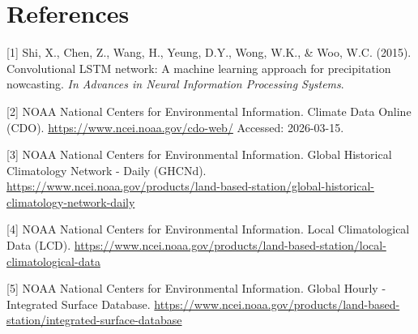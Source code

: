 \documentclass{article}
\begin{document}
\section*{References}

\medskip
{
\small
[1] Shi, X., Chen, Z., Wang, H., Yeung, D.Y., Wong, W.K., \& Woo, W.C. (2015). Convolutional LSTM network: A machine learning approach for precipitation nowcasting. \textit{In Advances in Neural Information Processing Systems}.

[2] NOAA National Centers for Environmental Information. Climate Data Online (CDO). \url{https://www.ncei.noaa.gov/cdo-web/} Accessed: 2026-03-15.

[3] NOAA National Centers for Environmental Information. Global Historical Climatology Network - Daily (GHCNd). \url{https://www.ncei.noaa.gov/products/land-based-station/global-historical-climatology-network-daily}

[4] NOAA National Centers for Environmental Information. Local Climatological Data (LCD). \url{https://www.ncei.noaa.gov/products/land-based-station/local-climatological-data}

[5] NOAA National Centers for Environmental Information. Global Hourly - Integrated Surface Database. \url{https://www.ncei.noaa.gov/products/land-based-station/integrated-surface-database}

}
\end{document}
